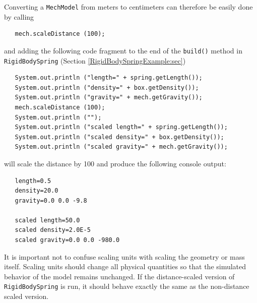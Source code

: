 Converting a {\tt MechModel} from meters to centimeters can therefore be
easily done by calling 
%
\begin{lstlisting}
   mech.scaleDistance (100);
\end{lstlisting}
%
and adding the following code fragment to the end of the {\tt build()}
method in {\tt RigidBodySpring} (Section \ref{RigidBodySpringExample:sec})
%
\begin{lstlisting}
   System.out.println ("length=" + spring.getLength());
   System.out.println ("density=" + box.getDensity());
   System.out.println ("gravity=" + mech.getGravity());
   mech.scaleDistance (100);
   System.out.println ("");
   System.out.println ("scaled length=" + spring.getLength());
   System.out.println ("scaled density=" + box.getDensity());
   System.out.println ("scaled gravity=" + mech.getGravity());
\end{lstlisting}
%
will scale the distance by 100 and produce the following console output:
%
\begin{lstlisting}
   length=0.5
   density=20.0
   gravity=0.0 0.0 -9.8

   scaled length=50.0
   scaled density=2.0E-5
   scaled gravity=0.0 0.0 -980.0
\end{lstlisting}
%

It is important not to confuse scaling units with scaling
the geometry or mass itself. Scaling units should change
all physical quantities so that the simulated behavior of the
model remains unchanged.
If the distance-scaled version of {\tt RigidBodySpring} is
run, it should behave exactly the same as the non-distance
scaled version.


%
%

